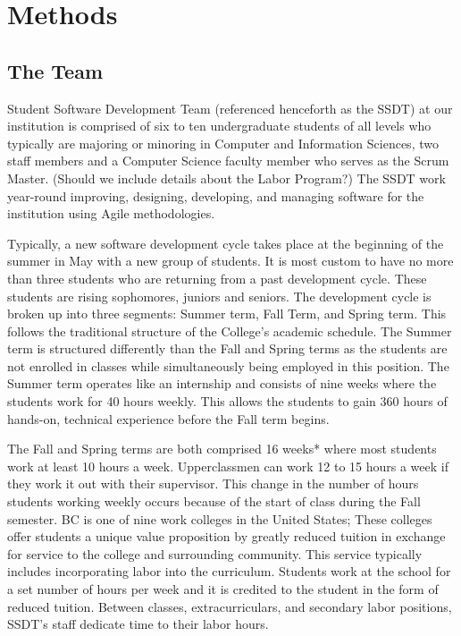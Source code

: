 \section{Methods}
\subsection{The Team}
Student Software Development Team (referenced henceforth as the SSDT) at our institution is comprised of six to ten undergraduate students of all levels who typically are majoring or minoring in Computer and Information Sciences, two staff members and a Computer Science faculty member who serves as the Scrum Master. (Should we include details about the Labor Program?) The SSDT work year-round improving, designing, developing, and managing software for the institution using Agile methodologies.

Typically, a new software development cycle takes place at the beginning of the summer in May with a new group of students. It is most custom to have no more than three students who are returning from a past development cycle. These students are rising sophomores, juniors and seniors. The development cycle is broken up into three segments: Summer term, Fall Term, and Spring term. This follows the traditional structure of the College's academic schedule. The Summer term is structured differently than the Fall and Spring terms as the students are not enrolled in classes while simultaneously being employed in this position. The Summer term operates like an internship and consists of nine weeks where the students work for 40 hours weekly. This allows the students to gain 360 hours of hands-on, technical experience before the Fall term begins. 

The Fall and Spring terms are both comprised 16 weeks* where most students work at least 10 hours a week. Upperclassmen can work 12 to 15 hours a week if they work it out with their supervisor. This change in the number of hours students working weekly occurs because of the start of class during the Fall semester. BC is one of nine work colleges in the United States; These colleges offer students a unique value proposition by greatly reduced tuition in exchange for service to the college and surrounding community. This service typically includes incorporating labor into the curriculum. Students work at the school for a set number of hours per week and it is credited to the student in the form of reduced tuition. Between classes, extracurriculars, and secondary labor positions, SSDT's staff dedicate time to their labor hours.

